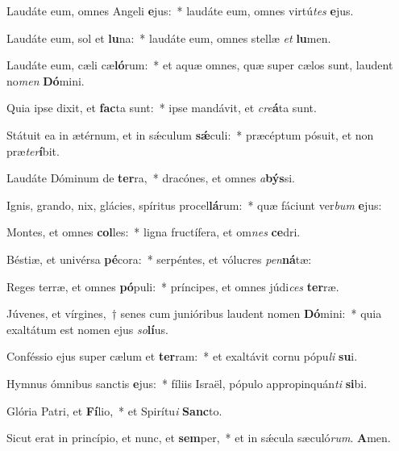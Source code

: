 Laudáte eum, omnes Angeli \textbf{e}jus:~* laudáte eum, omnes virtú\textit{tes} \textbf{e}jus.

Laudáte eum, sol et \textbf{lu}na:~* laudáte eum, omnes stellæ \textit{et} \textbf{lu}men.

Laudáte eum, cæli cæ\textbf{ló}rum:~* et aquæ omnes, quæ super cælos sunt, laudent no\textit{men} \textbf{Dó}mini.

Quia ipse dixit, et \textbf{fac}ta sunt:~* ipse mandávit, et \textit{cre}\textbf{á}ta sunt.

Státuit ea in ætérnum, et in sǽculum \textbf{sǽ}culi:~* præcéptum pósuit, et non præ\textit{ter}\textbf{í}bit.

Laudáte Dóminum de \textbf{ter}ra,~* dracónes, et omnes \textit{a}\textbf{býs}si.

Ignis, grando, nix, glácies, spíritus procel\textbf{lá}rum:~* quæ fáciunt ver\textit{bum} \textbf{e}jus:

Montes, et omnes \textbf{col}les:~* ligna fructífera, et om\textit{nes} \textbf{ce}dri.

Béstiæ, et univérsa \textbf{pé}cora:~* serpéntes, et vólucres \textit{pen}\textbf{ná}tæ:

Reges terræ, et omnes \textbf{pó}puli:~* príncipes, et omnes júdi\textit{ces} \textbf{ter}ræ.

Júvenes, et vírgines,~† senes cum junióribus laudent nomen \textbf{Dó}mini:~* quia exaltátum est nomen ejus \textit{so}\textbf{lí}us.

Conféssio ejus super cælum et \textbf{ter}ram:~* et exaltávit cornu pópu\textit{li} \textbf{su}i.

Hymnus ómnibus sanctis \textbf{e}jus:~* fíliis Israël, pópulo appropinquán\textit{ti} \textbf{si}bi.

Glória Patri, et \textbf{Fí}lio,~* et Spirítu\textit{i} \textbf{Sanc}to.

Sicut erat in princípio, et nunc, et \textbf{sem}per,~* et in sǽcula sæculó\textit{rum}. \textbf{A}men.

